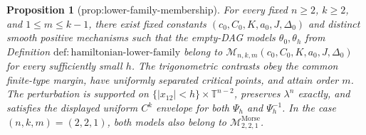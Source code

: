 \documentclass{article}
\newtheorem{proposition}{Proposition}
\begin{document}
\begin{proposition}[prop:lower-family-membership]\label{prop:lower-family-membership}
For every fixed \(n\ge2\), \(k\ge2\), and \(1\le m\le k-1\), there exist fixed constants \((c_0,C_0,K,a_0,J,\Delta_0)\) and distinct smooth positive mechanisms such that the empty-DAG models \(\theta_0,\theta_h\) from Definition \(\mathrm{def:hamiltonian\text{-}lower\text{-}family}\) belong to \(\mathcal M_{n,k,m}(c_0,C_0,K,a_0,J,\Delta_0)\) for every sufficiently small \(h\). The trigonometric contrasts obey the common finite-type margin, have uniformly separated critical points, and attain order \(m\). The perturbation is supported on \(\{|x_{12}|<h\}\times\mathbb T^{n-2}\), preserves \(\lambda^n\) exactly, and satisfies the displayed uniform \(C^k\) envelope for both \(\Psi_h\) and \(\Psi_h^{-1}\). In the case \((n,k,m)=(2,2,1)\), both models also belong to \(\mathcal M^{\mathrm{Morse}}_{2,2,1}\).
\end{proposition}
\end{document}
